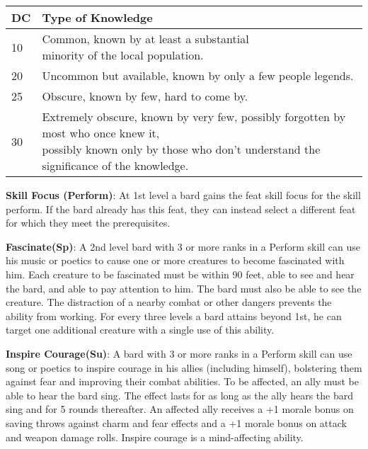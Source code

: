 \begin{center}
\begin{adjustwidth}{-4cm}{}
\begin{small}
\begin{tabular}{| l | l |}
\hline
DC &Type of Knowledge \\
\hline
10 &\makecell{Common, known by at least a substantial\\ minority of the local population.} \\
20 &Uncommon but available, known by only a few people legends. \\
25 &Obscure, known by few, hard to come by. \\
30 &\makecell{Extremely obscure, known by very few, possibly forgotten by most who once knew it,\\ possibly known only by those who don't understand the significance of the knowledge.} \\
\hline
\end{tabular}
\end{small}
\end{adjustwidth}
\end{center}

\textbf{Skill Focus (Perform)}: At 1st level a bard gains the feat skill focus for the skill perform. If the bard already has this feat, they can instead select a different feat for which they meet the prerequisites.

\textbf{Fascinate(Sp)}: A 2nd level bard with 3 or more ranks in a Perform skill can use his music or poetics to cause one or more creatures to become fascinated with him. Each creature to be fascinated must be within 90 feet, able to see and hear the bard, and able to pay attention to him. The bard must also be able to see the creature. The distraction of a nearby combat or other dangers prevents the ability from working. For every three levels a bard attains beyond 1st, he can target one additional creature with a single use of this ability.

\textbf{Inspire Courage(Su)}: A bard with 3 or more ranks in a Perform skill can use song or poetics to inspire courage in his allies (including himself), bolstering them against fear and improving their combat abilities. To be affected, an ally must be able to hear the bard sing. The effect lasts for as long as the ally hears the bard sing and for 5 rounds thereafter. An affected ally receives a +1 morale bonus on saving throws against charm and fear effects and a +1 morale bonus on attack and weapon damage rolls. Inspire courage is a mind-affecting ability.

